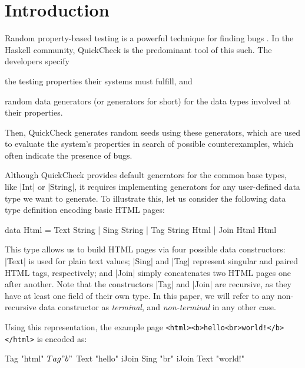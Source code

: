 \section{Introduction}
\label{sec:intro}

%
Random property-based testing is a powerful technique for finding bugs
\cite{ArtsHNS15, HughesPAN16, HughesNSA16}.
%
In the Haskell community, QuickCheck is the predominant tool of this such.
%
The developers specify
%
\begin{inparaenum}[(i)]
\item the testing properties their systems must fulfill, and
\item random data generators (or generators for short) for the data types
  involved at their properties.
\end{inparaenum}
%
Then, QuickCheck generates random seeds using these generators, which are used
to evaluate the system's properties in search of possible counterexamples, which
often indicate the presence of bugs.


%
Although QuickCheck provides default generators for the common base types, like
|Int| or |String|, it requires implementing generators for any user-defined data
type we want to generate.
%
%
To illustrate this, let us consider the following data type definition encoding
basic HTML pages:

\begin{code}
data Html  =  Text  String
           |  Sing  String
           |  Tag   String Html
           |  Join  Html Html
\end{code}
%
This type allows us to build HTML pages via four possible data constructors:
|Text| is used for plain text values; |Sing| and |Tag| represent singular and
paired HTML tags, respectively; and |Join| simply concatenates two HTML pages
one after another.
%
Note that the constructors |Tag| and |Join| are recursive, as they have at least
one field of their own type.
%
In this paper, we will refer to any non-recursive data constructor as
\emph{terminal}, and \emph{non-terminal} in any other case.


Using this representation, the example page \linebreak
%
\texttt{<html><b>hello<br>world!</b></html>}
%
is encoded as:
%
\begin{code}
Tag "html" $ Tag "b" $
  Text "hello" iJoin Sing "br" iJoin Text "world!"
\end{code} %

